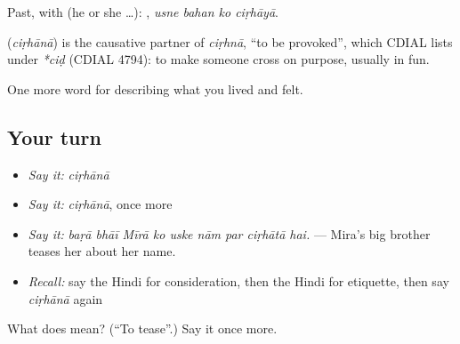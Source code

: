 Past, with  (he or she …):    , \emph{usne bahan ko ciṛhāyā}.

\begin{cousinweb}
\textbf{} (\emph{ciṛhānā}) is the causative partner of \emph{ciṛhnā}, \textquotedblleft{}to be provoked\textquotedblright{}, which CDIAL lists under \emph{*ciḍ} (CDIAL 4794): to make someone cross on purpose, usually in fun.
\end{cousinweb}

\begin{grammarlens}[title={What you've built}]
One more word for describing what you lived and felt.
\end{grammarlens}

\subsection*{Your turn}
\begin{itemize}
\raggedright
  \item \emph{Say it:} \emph{ciṛhānā}
  \item \emph{Say it:} \emph{ciṛhānā}, once more
  \item \emph{Say it:} \emph{baṛā bhāī Mīrā ko uske nām par ciṛhātā hai.} — Mira's big brother teases her about her name.
  \item \emph{Recall:} say the Hindi for consideration, then the Hindi for etiquette, then say \emph{ciṛhānā} again
\end{itemize}

\begin{tcolorbox}[breakable,colback=teal!4,colframe=teal!35!black,title={Before you move on}]
What does  mean? (\textquotedblleft{}To tease\textquotedblright{}.) Say it once more.
\end{tcolorbox}
